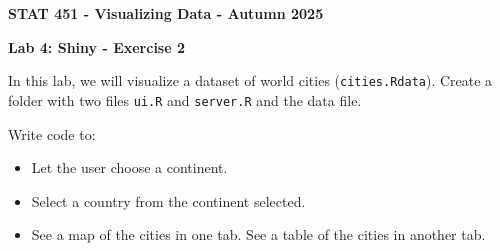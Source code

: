 \documentclass[letterpaper, 12pt]{article}
\begin{document}
\begin{center}
\textbf{\Large{STAT 451 - Visualizing Data - Autumn 2025}}
\end{center}

\vspace{2em}

\textbf{\large{Lab 4: Shiny - Exercise 2}}

\vspace{2em}

In this lab, we will visualize a dataset of world cities (\verb|cities.Rdata|). Create a folder with two files \verb|ui.R| and \verb|server.R| and the data file.

\vspace{1em}

Write code to:
\begin{itemize}
	\item Let the user choose a continent.
	\item Select a country from the continent selected.
	\item See a map of the cities in one tab. See a table of the cities in another tab.
\end{itemize}

\vspace{1em}
 
\end{document}
